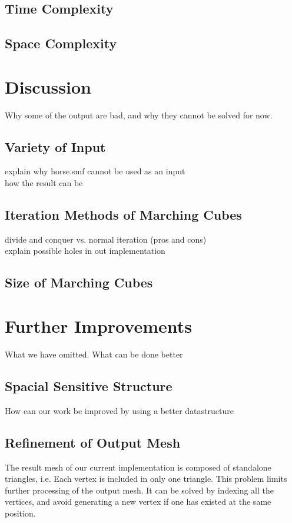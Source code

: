 \documentclass[acmcmpt, twoside]{acmsmall}
\begin{document}
\subsection{Time Complexity}
\subsection{Space Complexity}

\section{Discussion}
Why some of the output are bad, and why they cannot be solved for now.
\subsection{Variety of Input}
explain why horse.smf cannot be used as an input \\
how the result can be

\subsection{Iteration Methods of Marching Cubes}
divide and conquer vs. normal iteration (pros and cons) \\
explain possible holes in out implementation

\subsection{Size of Marching Cubes}

\section{Further Improvements}
What we have omitted. What can be done better
\subsection{Spacial Sensitive Structure}
How can our work be improved by using a better datastructure
\subsection{Refinement of Output Mesh}
The result mesh of our current implementation is composed of standalone triangles, i.e. Each vertex is included in only one triangle. This problem limits further processing of the output mesh. It can be solved by indexing all the vertices, and avoid generating a new vertex if one has existed at the same position.
\end{document}
